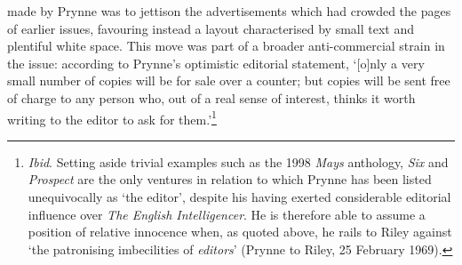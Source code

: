 \documentclass[]{article}
\begin{document}
made by Prynne was to jettison the advertisements which had crowded the
pages of earlier issues, favouring instead a layout characterised by
small text and plentiful white space. This move was part of a broader
anti-commercial strain in the issue: according to Prynne's optimistic
editorial statement, `{[}o{]}nly a very small number of copies will be
for sale over a counter; but copies will be sent free of charge to any
person who, out of a real sense of interest, thinks it worth writing to
the editor to ask for them.'\footnote{\emph{Ibid}. Setting aside trivial
  examples such as the 1998 \emph{Mays} anthology, \emph{Six} and
  \emph{Prospect} are the only ventures in relation to which Prynne has
  been listed unequivocally as `the editor', despite his having exerted
  considerable editorial influence over \emph{The English
  Intelligencer}. He is therefore able to assume a position of relative
  innocence when, as quoted above, he rails to Riley against `the
  patronising imbecilities of \emph{editors}' (Prynne to Riley, 25
  February 1969).}
\end{document}
